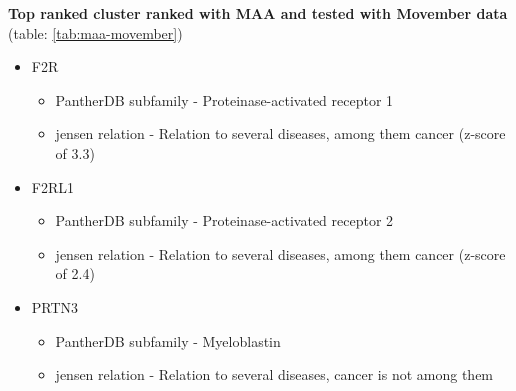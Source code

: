 \textbf{Top ranked cluster ranked with MAA and tested with Movember data}
(table: \ref{tab:maa-movember})

\begin{itemize}
    \item F2R
        \begin{itemize}
            \item PantherDB subfamily - Proteinase-activated receptor 1
            \item \gls{jensen} relation -  Relation to several diseases, among
                them cancer (z-score of 3.3)
        \end{itemize}
    \item F2RL1
        \begin{itemize}
            \item PantherDB subfamily - Proteinase-activated receptor 2
            \item \gls{jensen} relation - Relation to several diseases, among
                them cancer (z-score of 2.4)
        \end{itemize}
    \item PRTN3
        \begin{itemize}
            \item PantherDB subfamily - Myeloblastin
            \item \gls{jensen} relation - Relation to several diseases, cancer
                is not among them
        \end{itemize}
\end{itemize}

